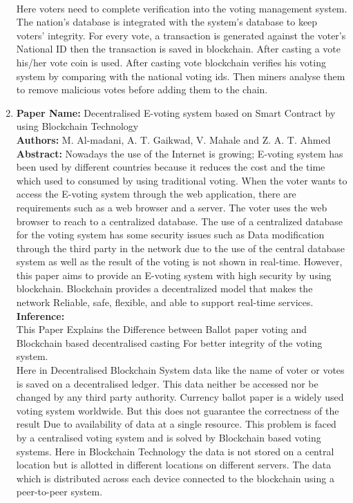 \documentclass[oneside, 12pt]{book}
\begin{document}
\begin{enumerate}
	      \\Here voters need to complete verification into the voting management system. The nation's database is integrated with the system's database to keep voters’ integrity. For every vote, a transaction is generated against the voter’s National ID then the transaction is saved in blockchain. After casting a vote his/her vote coin is used. After casting vote blockchain verifies his voting system by comparing with the national voting ids. Then miners analyse them to remove malicious votes before adding them to the chain.
	\newpage
	\item
	      \textbf{Paper Name:} Decentralised E-voting system based on Smart Contract by using Blockchain Technology \cite{al2020decentralized}\\
	      \textbf{Authors:} M. Al-madani, A. T. Gaikwad, V. Mahale and Z. A. T. Ahmed\\
	      \textbf{Abstract:} Nowadays the use of the Internet is growing; E-voting system has been used by different countries because it reduces the cost and the time which used to consumed by using traditional voting. When the voter wants to access the E-voting system through the web application, there are requirements such as a web browser and a server. The voter uses the web browser to reach to a centralized database. The use of a centralized database for the voting system has some security issues such as Data modification through the third party in the network due to the use of the central database system as well as the result of the voting is not shown in real-time. However, this paper aims to provide an E-voting system with high security by using blockchain. Blockchain provides a decentralized model that makes the network Reliable, safe, flexible, and able to support real-time services.\\
	      \textbf{Inference:}
	      \\This Paper Explains the Difference between Ballot paper voting and Blockchain based decentralised casting For better integrity of the voting system.
	      \\Here in Decentralised Blockchain System data like the name of voter or votes is saved on a decentralised ledger. This data neither be accessed nor be changed by any third party authority. Currency ballot paper is a widely used voting system worldwide. But this does not guarantee the correctness of the result Due to availability of data at a single resource. This problem is faced by a centralised voting system and is solved by Blockchain based voting systems. Here in Blockchain Technology the data is not stored on a central location but is allotted in different locations on different servers. The data which is distributed across each device connected to the blockchain using a peer-to-peer system.

\end{enumerate}
\end{document}
